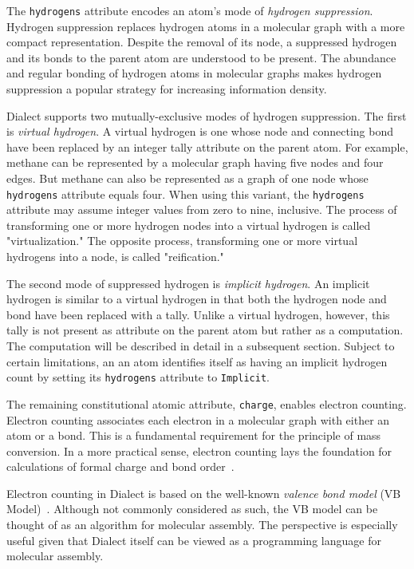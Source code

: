 \documentclass{article}
\def\ttt{\texttt}
\begin{document}
The \ttt{hydrogens} attribute encodes an atom's mode of \textit{hydrogen suppression}. Hydrogen suppression replaces hydrogen atoms in a molecular graph with a more compact representation. Despite the removal of its node, a suppressed hydrogen and its bonds to the parent atom are understood to be present. The abundance and regular bonding of hydrogen atoms in molecular graphs makes hydrogen suppression a popular strategy for increasing information density.

Dialect supports two mutually-exclusive modes of hydrogen suppression. The first is \textit{virtual hydrogen}. A virtual hydrogen is one whose node and connecting bond have been replaced by an integer tally attribute on the parent atom. For example, methane can be represented by a molecular graph having five nodes and four edges. But methane can also be represented as a graph of one node whose \ttt{hydrogens} attribute equals four. When using this variant, the \ttt{hydrogens} attribute may assume integer values from zero to nine, inclusive. The process of transforming one or more hydrogen nodes into a virtual hydrogen is called "virtualization." The opposite process, transforming one or more virtual hydrogens into a node, is called "reification."

The second mode of suppressed hydrogen is \textit{implicit hydrogen}. An implicit hydrogen is similar to a virtual hydrogen in that both the hydrogen node and bond have been replaced with a tally. Unlike a virtual hydrogen, however, this tally is not present as attribute on the parent atom but rather as a computation. The computation will be described in detail in a subsequent section. Subject to certain limitations, an an atom identifies itself as having an implicit hydrogen count by setting its \ttt{hydrogens} attribute to \ttt{Implicit}.

The remaining constitutional atomic attribute, \ttt{charge}, enables electron counting. Electron counting associates each electron in a molecular graph with either an atom or a bond. This is a fundamental requirement for the principle of mass conversion. In a more practical sense, electron counting lays the foundation for calculations of formal charge and bond order~\cite{dietz:1995}.

Electron counting in Dialect is based on the well-known \textit{valence bond model} (VB Model)~\cite{lewis:1916}. Although not commonly considered as such, the VB model can be thought of as an algorithm for molecular assembly. The perspective is especially useful given that Dialect itself can be viewed as a programming language for molecular assembly.
\end{document}
